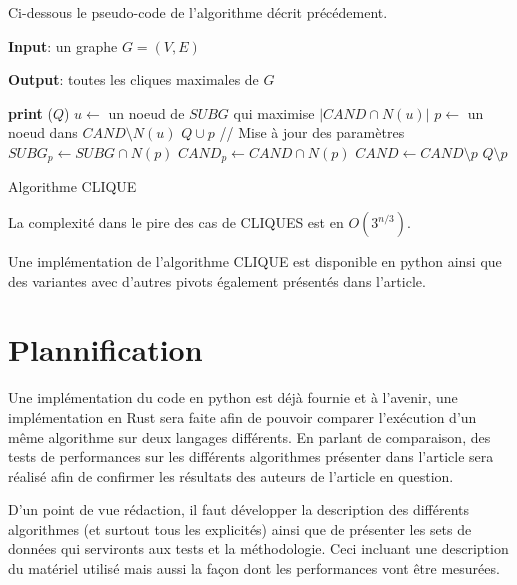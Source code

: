\documentclass[12pt,a4paper]{article}
\begin{document}
Ci-dessous le pseudo-code de l'algorithme décrit précédement.
\begin{algorithm}[H]
  \textbf{Input}: un graphe $G = (V,E)$

  \textbf{Output}: toutes les cliques maximales de $G$
  \begin{algorithmic}[1]
       
        \State \textbf{print} ($ Q $)
      \Else
        \State $u \gets$ un noeud de $SUBG$ qui maximise $|CAND \cap N(u)|$
          \State $p \gets$ un noeud dans $CAND \setminus N(u)$
          \State $ Q \cup p $ 
          \State // Mise à jour des paramètres
          \State $SUBG_p \gets SUBG \cap N(p)$
          \State $CAND_p \gets CAND \cap N(p)$
          \State {}
          \State $CAND \gets CAND \setminus {p}$
          \State $ Q \setminus p $ 
        \EndWhile
      \EndIf
    \EndProcedure
    \State {}
  \end{algorithmic}
  \caption{\label{fig:cliques} Algorithme CLIQUE}
\end{algorithm}

La complexité dans le pire des cas de CLIQUES est en $ O(3^{n/3}) $\cite{CONTE20221}.

Une implémentation de l'algorithme CLIQUE est disponible en python ainsi que des variantes avec d'autres pivots également présentés dans l'article.

\section{Plannification}%
\label{sec:plan}

Une implémentation du code en python est déjà fournie et à l'avenir, une implémentation en Rust sera faite afin de pouvoir comparer l'exécution d'un même algorithme sur deux langages différents. En parlant de comparaison, des tests de performances sur les différents algorithmes présenter dans l'article sera réalisé afin de confirmer les résultats des auteurs de l'article en question.

D'un point de vue rédaction, il faut développer la description des différents algorithmes (et surtout tous les explicités) ainsi que de présenter les sets de données qui servironts aux tests et la méthodologie. Ceci incluant une description du matériel utilisé mais aussi la façon dont les performances vont être mesurées.
\end{document}
